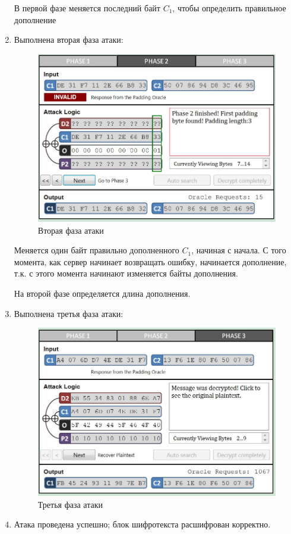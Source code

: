 \documentclass[a4paper, 14pt]{extarticle}
\begin{document}
\begin{enumerate}
    В первой фазе меняется последний байт $C_1$, чтобы определить правильное дополнение
    \item Выполнена вторая фаза атаки:
    \begin{figure}[h]
        \centering
        \includegraphics[width=\textwidth]{img/S021.jpg}
        \caption{Вторая фаза атаки}%
    \end{figure}
    \FloatBarrier{}

    Меняется один байт правильно дополненного $C_1$, начиная с начала. С того момента, как сервер начинает возвращать ошибку, начинается дополнение, т.к. с этого момента начинают изменяется байты дополнения.
    
    На второй фазе определяется длина дополнения.
    \item Выполнена третья фаза атаки:
    \begin{figure}[h]
        \centering
        \includegraphics[width=\textwidth]{img/S022.jpg}
        \caption{Третья фаза атаки}%
    \end{figure}
    \FloatBarrier{}
    \item Атака проведена успешно; блок шифротекста расшифрован корректно.
\end{enumerate}
\end{document}
